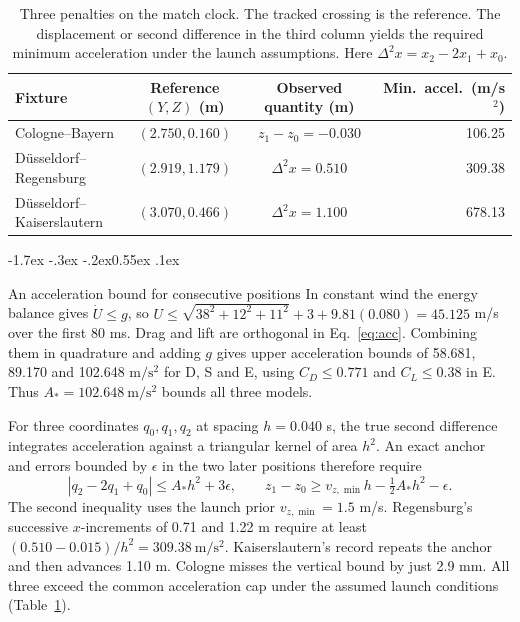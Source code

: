 \documentclass[11pt,letterpaper]{article}
\makeatletter
\renewcommand{\subsection}{\reserveheadroom\@startsection{subsection}{2}{\z@}
  {-1.7ex \@plus -.3ex \@minus -.2ex}{0.55ex \@plus .1ex}
  {\normalfont\normalsize\sffamily\bfseries\color{black}\raggedright}}
\newcommand{\reserveheadroom}{\par\ifdim\dimexpr\pagegoal-\pagetotal\relax<5\baselineskip\newpage\fi}
\makeatother
\begin{document}
\begin{table}[htbp]
\centering
\caption{Three penalties on the match clock. The tracked crossing is the reference. The displacement or second difference in the third column yields the required minimum acceleration under the launch assumptions. Here \(\Delta^2x=x_2-2x_1+x_0\).}
\label{tab:field}
\small
\setlength{\tabcolsep}{3.4pt}
\renewcommand{\arraystretch}{1.13}
\begin{tabular*}{\linewidth}{@{\extracolsep{\fill}}lccr@{}}
\toprule
Fixture & Reference \((Y,Z)\) (m) & Observed quantity (m) & Min.\ accel.\ (m/s\(^2\))\\
\midrule
Cologne--Bayern           & \((2.750,0.160)\) & \(z_1-z_0=-0.030\) & 106.25\\
D\"usseldorf--Regensburg  & \((2.919,1.179)\) & \(\Delta^2x=0.510\) & 309.38\\
D\"usseldorf--Kaiserslautern & \((3.070,0.466)\) & \(\Delta^2x=1.100\) & 678.13\\
\bottomrule
\end{tabular*}
\end{table}

\subsection{An acceleration bound for consecutive positions}
In constant wind the energy balance gives \(\dot U\le g\), so \(U\le\sqrt{38^2+12^2+11^2}+3+9.81(0.080)=45.125\) m/s over the first 80 ms. Drag and lift are orthogonal in Eq.~\eqref{eq:acc}. Combining them in quadrature and adding \(g\) gives upper acceleration bounds of 58.681, 89.170 and 102.648 \(\mathrm{m/s^2}\) for D, S and E, using \(C_D\le0.771\) and \(C_L\le0.38\) in E. Thus \(A_*=102.648\ \mathrm{m/s^2}\) bounds all three models.

For three coordinates \(q_0,q_1,q_2\) at spacing \(h=0.040\) s, the true second difference integrates acceleration against a triangular kernel of area \(h^2\). An exact anchor and errors bounded by \(\epsilon\) in the two later positions therefore require
\begin{equation}
 |q_2-2q_1+q_0|\le A_*h^2+3\epsilon,\qquad
 z_1-z_0\ge v_{z,\min}h-\tfrac12 A_*h^2-\epsilon .
 \label{eq:support}
\end{equation}
The second inequality uses the launch prior \(v_{z,\min}=1.5\) m/s. Regensburg's successive \(x\)-increments of 0.71 and 1.22 m require at least \((0.510-0.015)/h^2=309.38\ \mathrm{m/s^2}\). Kaiserslautern's record repeats the anchor and then advances 1.10 m. Cologne misses the vertical bound by just 2.9 mm. All three exceed the common acceleration cap under the assumed launch conditions (Table~\ref{tab:field}).
\end{document}
